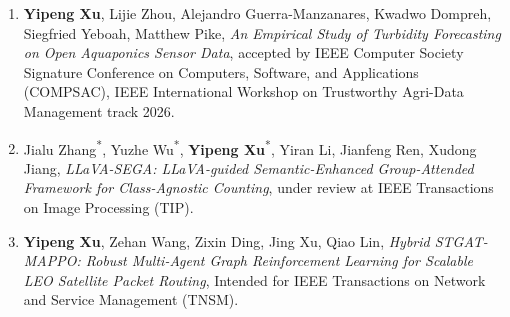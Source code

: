 \begin{enumerate}[leftmargin=*]
    \vspace{-0.5em}
    \item \textbf{Yipeng Xu}, Lijie Zhou, Alejandro Guerra-Manzanares, Kwadwo Dompreh, Siegfried Yeboah, Matthew Pike, \textit{An Empirical Study of Turbidity Forecasting on Open Aquaponics Sensor Data}, accepted by IEEE Computer Society Signature Conference on Computers, Software, and Applications (COMPSAC), IEEE International Workshop on Trustworthy Agri-Data Management track 2026.
    \vspace{-0.5em}
    \item {Jialu Zhang}\textsuperscript{*}, {Yuzhe Wu}\textsuperscript{*}, \textbf{Yipeng Xu}\textsuperscript{*}, Yiran Li, Jianfeng Ren, Xudong Jiang, \textit{LLaVA-SEGA: LLaVA-guided Semantic-Enhanced Group-Attended Framework for Class-Agnostic Counting}, under review at IEEE Transactions on Image Processing (TIP).
    \vspace{-0.5em}
    \item \textbf{Yipeng Xu}, Zehan Wang, Zixin Ding, Jing Xu, Qiao Lin, \textit{Hybrid STGAT-MAPPO: Robust Multi-Agent Graph Reinforcement Learning for Scalable LEO Satellite Packet Routing}, Intended for IEEE Transactions on Network and Service Management (TNSM).
    \vspace{-0em}
\end{enumerate}
\vspace{-5.5mm}


  


